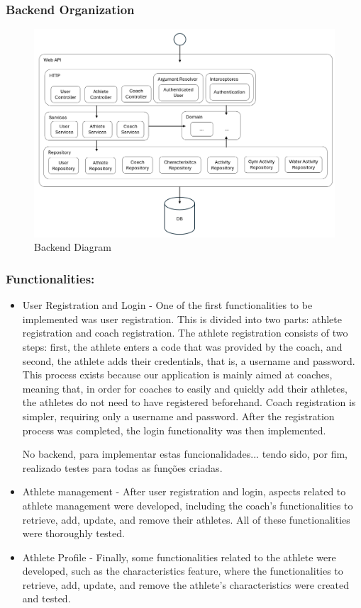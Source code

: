 \documentclass[a4paper,twoside,11pt]{article}
\begin{document}
\subsubsection{Backend Organization}
\begin{figure}[H]
\centering
\includegraphics[width=5in]{BackendDiagram.png}
\caption{Backend Diagram}
\end{figure}

\subsubsection{Functionalities:}
\begin{itemize}
\item User Registration and Login - 
One of the first functionalities to be implemented was user registration. This is divided into two parts: athlete registration and coach registration. The athlete registration consists of two steps: first, the athlete enters a code that was provided by the coach, and second, the athlete adds their credentials, that is, a username and password. This process exists because our application is mainly aimed at coaches, meaning that, in order for coaches to easily and quickly add their athletes, the athletes do not need to have registered beforehand. Coach registration is simpler, requiring only a username and password. After the registration process was completed, the login functionality was then implemented.

No backend, para implementar estas funcionalidades... tendo sido, por fim, realizado testes para todas as funções criadas.

\item Athlete management - 
After user registration and login, aspects related to athlete management were developed, including the coach's functionalities to retrieve, add, update, and remove their athletes. All of these functionalities were thoroughly tested.

\item Athlete Profile - 
Finally, some functionalities related to the athlete were developed, such as the characteristics feature, where the functionalities to retrieve, add, update, and remove the athlete's characteristics were created and tested.

\end{itemize}
\end{document}
